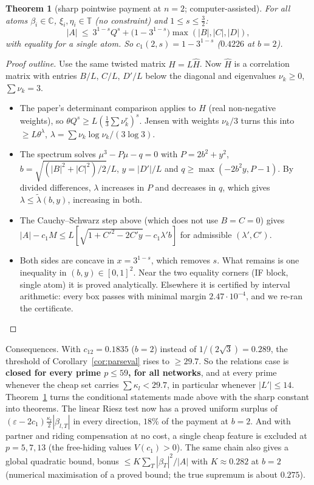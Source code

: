 \documentclass[11pt]{article}
\newtheorem{theorem}{Theorem}
\theoremstyle{definition}
\begin{document}
\begin{theorem}[sharp pointwise payment at $n=2$; computer-assisted]\label{thm:c1sharp}
For all atoms $\beta_i\in\mathbb C$, $\xi_i,\eta_i\in\mathbb T$ (no constraint) and $1\le s\le\frac32$:
\[|A|\ \le\ 3^{1-s}Q^s+\big(1-3^{1-s}\big)\max(|B|,|C|,|D|),\]
with equality for a single atom.  So $c_1(2,s)=1-3^{1-s}$ ($0.4226$ at $b=2$).
\end{theorem}
\begin{proof}[Proof outline]
Use the same twisted matrix $H=L\hat H$.  Now $\hat H$ is a correlation matrix with entries $B/L$, $C/L$, $D'/L$ below the diagonal and eigenvalues
$\nu_k\ge0$, $\sum\nu_k=3$.
\begin{itemize}
\item The paper's determinant comparison applies to $H$ (real non-negative weights), so $\theta Q^s\ge L(\frac13\sum\nu_k^r)^s$.  Jensen with weights $\nu_k/3$
turns this into $\ge L\theta^{\lambda}$, $\lambda=\sum\nu_k\log\nu_k/(3\log3)$.
\item The spectrum solves $\mu^3-P\mu-q=0$ with $P=2b^2+y^2$, $b=\sqrt{(|B|^2+|C|^2)/2}/L$, $y=|D'|/L$ and $q\ge\max(-2b^2y,P-1)$.  By divided differences, $\lambda$ increases
in $P$ and decreases in $q$, which gives $\lambda\le\tilde\lambda(b,y)$, increasing in both.
\item The Cauchy--Schwarz step above (which does not use $B=C=0$) gives $|A|-c_1M\le L[\sqrt{1+C'^2-2C'y}-c_1\lambda'b]$ for admissible $(\lambda',C')$.
\item Both sides are concave in $x=3^{1-s}$, which removes $s$.  What remains is one inequality in $(b,y)\in[0,1]^2$.  Near the two equality corners
(IF block, single atom) it is proved analytically.  Elsewhere it is certified by interval arithmetic: every box passes with minimal margin
$2.47\cdot10^{-4}$, and we re-ran the certificate.
\end{itemize}
\end{proof}
Consequences.  With $c_{12}=0.1835$ ($b=2$) instead of $1/(2\sqrt3)=0.289$, the threshold of Corollary~\ref{cor:parseval} rises to $\ge29.7$.  So the relations
case is \textbf{closed for every prime $p\le59$, for all networks}, and at every prime whenever the cheap set carries $\sum\kappa_l<29.7$, in particular whenever
$|L'|\le14$.  Theorem~\ref{thm:c1sharp} turns the conditional statements made above with the sharp constant into theorems.  The linear Riesz test
now has a proved uniform surplus of $(\varepsilon-2c_1)\frac{\kappa_l}2|\beta_{l,T}|$ in every direction, $18\%$ of the payment at $b=2$.  And with partner and riding
compensation at no cost, a single cheap feature is excluded at $p=5,7,13$ (the free-hiding values $V(c_1)>0$).  The same chain also gives a global
quadratic bound, bonus $\le K\sum_T|\beta_T|^2/|A|$ with $K\approx0.282$ at $b=2$ (numerical maximisation of a proved bound; the true supremum is about $0.275$).
\end{document}
